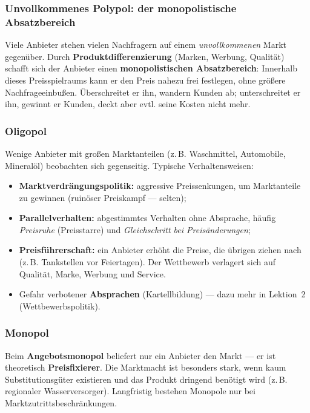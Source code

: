 \documentclass[11pt, a4paper]{article}
\begin{document}
\subsubsection{Unvollkommenes Polypol: der monopolistische Absatzbereich}

Viele Anbieter stehen vielen Nachfragern auf einem \emph{unvollkommenen} Markt gegenüber.
Durch \textbf{Produktdifferenzierung} (Marken, Werbung, Qualität) schafft sich der Anbieter
einen \textbf{monopolistischen Absatzbereich}: Innerhalb dieses Preisspielraums kann er den
Preis nahezu frei festlegen, ohne größere Nachfrageeinbußen. Überschreitet er ihn, wandern
Kunden ab; unterschreitet er ihn, gewinnt er Kunden, deckt aber evtl. seine Kosten nicht
mehr.

\subsubsection{Oligopol}

Wenige Anbieter mit großen Marktanteilen (z.\,B. Waschmittel, Automobile, Mineralöl)
beobachten sich gegenseitig. Typische Verhaltensweisen:

\begin{itemize}
  \item \textbf{Marktverdrängungspolitik:} aggressive Preissenkungen, um Marktanteile zu
    gewinnen (ruinöser Preiskampf --- selten);
  \item \textbf{Parallelverhalten:} abgestimmtes Verhalten ohne Absprache, häufig
    \emph{Preisruhe} (Preisstarre) und \emph{Gleichschritt bei Preisänderungen};
  \item \textbf{Preisführerschaft:} ein Anbieter erhöht die Preise, die übrigen ziehen nach
    (z.\,B. Tankstellen vor Feiertagen). Der Wettbewerb verlagert sich auf Qualität, Marke,
    Werbung und Service.
  \item Gefahr verbotener \textbf{Absprachen} (Kartellbildung) --- dazu mehr in Lektion~2
    (Wettbewerbspolitik).
\end{itemize}

\subsubsection{Monopol}

Beim \textbf{Angebotsmonopol} beliefert nur ein Anbieter den Markt --- er ist theoretisch
\textbf{Preisfixierer}. Die Marktmacht ist besonders stark, wenn kaum Substitutionsgüter
existieren und das Produkt dringend benötigt wird (z.\,B. regionaler Wasserversorger).
Langfristig bestehen Monopole nur bei Marktzutrittsbeschränkungen.
\end{document}
